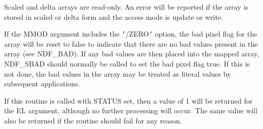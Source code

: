 \documentclass[twoside,11pt,nolof]{starlink}
\providecommand{\hi}[1]{{\texttt{#1}}}
\begin{document}
{{{         \sstitem
         Scaled and delta arrays are read-only. An error will be reported
         if the array is stored in scaled or delta form and the access mode
         is update or write.

         \sstitem
         If the MMOD argument includes the \hi{'}/ZERO\hi{'} option, the
         bad pixel flag for the array will be reset to false to indicate
         that there are no bad values present in the array (see
         NDF\_BAD). If any bad values are then placed into the mapped
         array, NDF\_SBAD should normally be called to set the bad pixel
         flag true. If this is not done, the bad values in the array may
         be treated as literal values by subsequent applications.

         \sstitem
         If this routine is called with STATUS set, then a value of 1
         will be returned for the EL argument, although no further
         processing will occur.  The same value will also be returned if
         the routine should fail for any reason.
      }
   }
}
\end{document}
